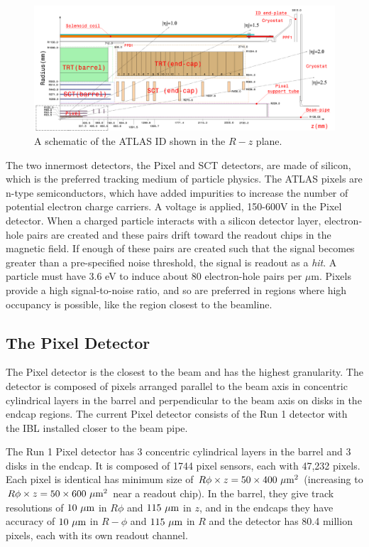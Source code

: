 \begin{figure}[!h]
\centering
\includegraphics[width=.8\textwidth]{figures/Detector/atlas-id-layers.png}
\caption{A schematic of the \ac{ATLAS} \ac{ID} shown in the $R-z$ plane. \cite{id-cutaway}}
\label{fig:atlas-id-layers}
\end{figure}


The two innermost detectors, the Pixel and \ac{SCT} detectors, are made of silicon, which is the preferred tracking medium of particle physics. The \ac{ATLAS} pixels are n-type semiconductors, which have added impurities to increase the number of potential electron charge carriers. A voltage is applied, 150-600V in the Pixel detector.  When a charged particle interacts with a silicon detector layer, electron-hole pairs are created and these pairs drift toward the readout chips in the magnetic field. If enough of these pairs are created such that the signal becomes greater than a pre-specified noise threshold, the signal is readout as a \emph{hit}. A particle must have 3.6 eV to induce about 80 electron-hole pairs per $\mu$m. Pixels provide a high signal-to-noise ratio, and so are preferred in regions where high occupancy is possible, like the region closest to the beamline. \cite{silicon} 

\subsection{The Pixel Detector}

The Pixel detector is the closest to the beam and has the highest granularity. The detector is composed of pixels arranged parallel to the beam axis in concentric cylindrical layers in the barrel and perpendicular to the beam axis on disks in the endcap regions. The current Pixel detector consists of the Run 1 detector with the \ac{IBL} installed closer to the beam pipe. 

The Run 1 Pixel detector has 3 concentric cylindrical layers in the barrel and 3 disks in the endcap. It is composed of 1744 pixel sensors, each with 47,232 pixels. Each pixel is identical has minimum size of $R\phi \times z = 50 \times 400~\mu\text{m}^{2}$ (increasing to $R\phi \times z = 50 \times 600~\mu\text{m}^{2}$ near a readout chip). In the barrel, they give track resolutions of $10~\mu\text{m}$ in $R\phi$ and $115~\mu\text{m}$ in $z$, and in the endcaps they have accuracy of $10~\mu\text{m}$ in $R-\phi$ and $115~\mu\text{m}$ in $R$ and the detector has 80.4 million pixels, each with its own readout channel. 

